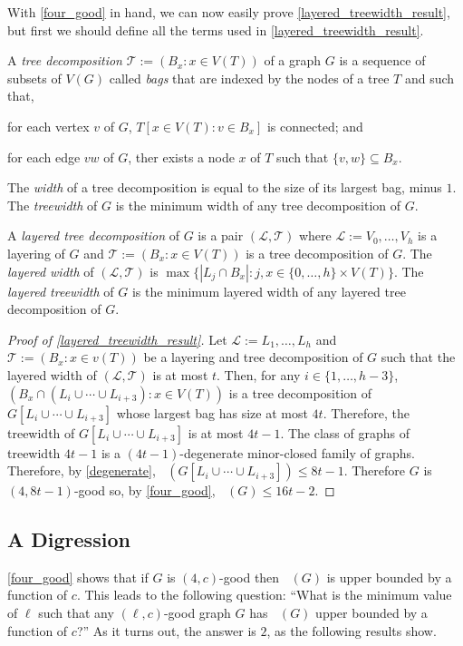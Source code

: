 \documentclass{patmorin}
\DeclareMathOperator{\odd}{\chi_o}
\begin{document}
With \cref{four_good} in hand, we can now easily prove \cref{layered_treewidth_result}, but first we should define all the terms used in \cref{layered_treewidth_result}.

A \emph{tree decomposition} $\mathcal{T}:=(B_x:x\in V(T))$ of a graph $G$ is a sequence of subsets of $V(G)$ called \emph{bags} that are indexed by the nodes of a tree $T$ and such that,
\begin{inparaenum}[(i)]
  \item for each vertex $v$ of $G$, $T[x\in V(T):v\in B_x]$ is connected; and
  \item for each edge $vw$ of $G$, ther exists a node $x$ of $T$ such that $\{v,w\}\subseteq B_x$.
\end{inparaenum}
The \emph{width} of a tree decomposition is equal to the size of its largest bag, minus $1$.  The \emph{treewidth} of $G$ is the minimum width of any tree decomposition of $G$.

A \emph{layered tree decomposition} of $G$ is a pair $(\mathcal{L},\mathcal{T})$ where $\mathcal{L}:=V_0,\ldots,V_h$ is a layering of $G$ and $\mathcal{T}:=(B_x:x\in V(T))$ is a tree decomposition of $G$.  The \emph{layered width} of $(\mathcal{L},\mathcal{T})$ is $\max\{|L_j\cap B_x|:j,x\in\{0,\ldots,h\}\times V(T)\}$.  The \emph{layered treewidth} of $G$ is the minimum layered width of any layered tree decomposition of $G$.

\begin{proof}[Proof of \cref{layered_treewidth_result}]
  Let $\mathcal{L}:=L_1,\ldots,L_h$ and $\mathcal{T}:=(B_x:x\in v(T))$ be a layering and tree decomposition of $G$ such that the layered width of $(\mathcal{L},\mathcal{T})$ is at most $t$.  Then, for any $i\in\{1,\ldots,h-3\}$, $(B_x\cap(L_i\cup\cdots\cup L_{i+3}):x\in V(T))$ is a tree decomposition of $G[L_i\cup\cdots\cup L_{i+3}]$ whose largest bag has size at most $4t$.  Therefore, the treewidth of $G[L_i\cup\cdots\cup L_{i+3}]$ is at most $4t-1$.  The class of graphs of treewidth $4t-1$ is a $(4t-1)$-degenerate minor-closed family of graphs.  Therefore, by \cref{degenerate}, $\odd(G[L_i\cup\cdots\cup L_{i+3}])\le 8t-1$.  Therefore $G$ is $(4,8t-1)$-good so, by \cref{four_good}, $\odd(G)\le 16t-2$.
\end{proof}

\subsection{A Digression}

\cref{four_good} shows that if $G$ is $(4,c)$-good then $\odd(G)$ is upper bounded by a function of $c$.  This leads to the following question:  ``What is the minimum value of $\ell$ such that any $(\ell,c)$-good graph $G$ has $\odd(G)$ upper bounded by a function of $c$?''  As it turns out, the answer is $2$, as the following results show.
\end{document}

